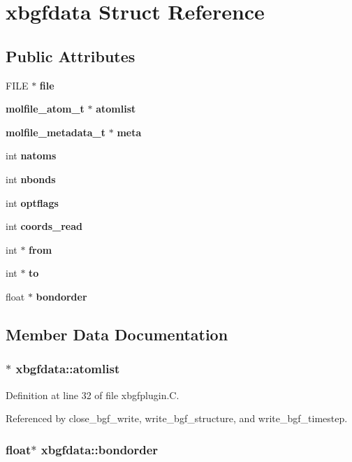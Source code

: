 \section{xbgfdata  Struct Reference}
\label{structxbgfdata}
\subsection*{Public Attributes}
\begin{CompactItemize}
\item 
FILE $\ast$ {\bf file}
\item 
{\bf molfile\_\-atom\_\-t} $\ast$ {\bf atomlist}
\item 
{\bf molfile\_\-metadata\_\-t} $\ast$ {\bf meta}
\item 
int {\bf natoms}
\item 
int {\bf nbonds}
\item 
int {\bf optflags}
\item 
int {\bf coords\_\-read}
\item 
int $\ast$ {\bf from}
\item 
int $\ast$ {\bf to}
\item 
float $\ast$ {\bf bondorder}
\end{CompactItemize}


\subsection{Member Data Documentation}
\subsubsection{$\ast$ xbgfdata::atomlist}\label{structxbgfdata_m1}




Definition at line 32 of file xbgfplugin.C.

Referenced by close\_\-bgf\_\-write, write\_\-bgf\_\-structure, and write\_\-bgf\_\-timestep.
\subsubsection{\setlength{\rightskip}{0pt plus 5cm}float$\ast$ xbgfdata::bondorder}\label{structxbgfdata_m9}




